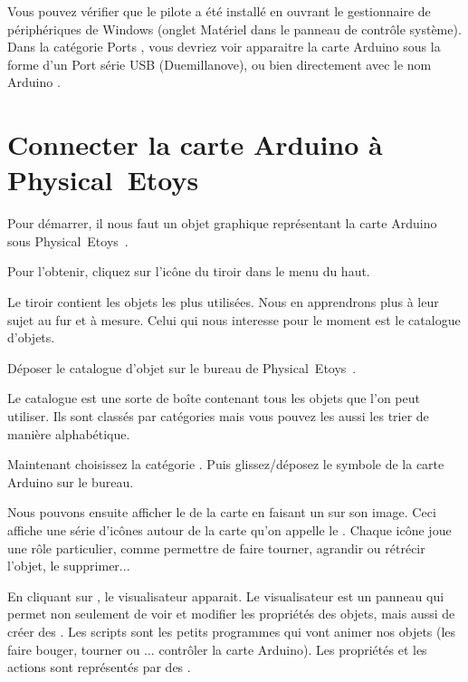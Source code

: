 \documentclass[french]{etoys-guide}
\def\appName{Physical~Etoys~}
\begin{document}
Vous pouvez vérifier que le pilote a été installé en ouvrant le gestionnaire de
périphériques de Windows (onglet \og Matériel \fg dans le panneau de contrôle
système).  Dans la catégorie \og Ports \fg, vous devriez voir apparaitre la
carte Arduino sous la forme d'un \og Port série USB \fg (Duemillanove), ou bien
directement avec le nom \og Arduino \fg.

\section{Connecter la carte Arduino à \appName}

Pour démarrer, il nous faut un objet graphique représentant la carte Arduino
sous \appName.

Pour l'obtenir, cliquez sur l'icône du tiroir  dans le menu du haut.


Le tiroir  contient les objets les plus utilisées. Nous en
apprendrons plus à leur sujet au fur et à mesure. Celui qui nous interesse pour
le moment est le catalogue d'objets.


Déposer le catalogue d'objet sur le bureau de \appName.


Le catalogue est une sorte de boîte contenant tous les objets que l'on peut
utiliser. Ils sont classés par catégories mais vous pouvez les aussi les trier
de manière alphabétique.

Maintenant choisissez la catégorie . Puis glissez/déposez le
symbole de la carte Arduino sur le bureau.

  
Nous pouvons ensuite afficher le  de la carte en faisant un
\rc sur son image. Ceci affiche une série d'icônes autour de la carte qu'on
appelle le . Chaque icône joue une rôle particulier, comme permettre de faire  tourner,
 agrandir ou rétrécir l'objet, le  supprimer...

En cliquant sur , le visualisateur apparait. Le visualisateur
est un panneau qui permet non seulement de voir et modifier les propriétés des
objets, mais aussi de créer des . Les scripts sont les
petits programmes qui vont animer nos objets (les faire bouger, tourner ou ...
contrôler la carte Arduino).  Les propriétés et les actions sont représentés
par des .
\end{document}
